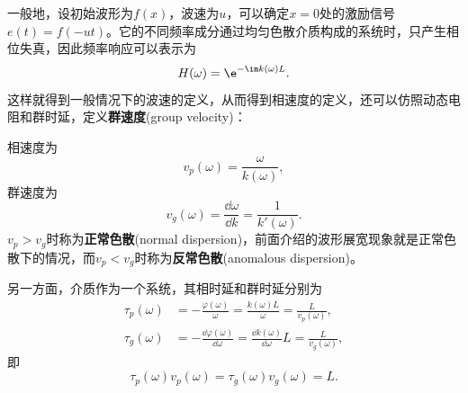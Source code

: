 一般地，设初始波形为$f(x)$，波速为$u$，可以确定$x=0$处的激励信号$e(t)=f(-ut)$。它的不同频率成分通过均匀色散介质构成的系统时，只产生相位失真，因此频率响应可以表示为
\begin{equation}
    H(\omega)=\e^{-\im k(\omega)L}.
\end{equation}
这样就得到一般情况下的波速的定义，从而得到相速度的定义，还可以仿照动态电阻和群时延，定义\textbf{群速度}(group velocity)：
\begin{definition}[相速度和群速度]
    相速度为
    \begin{equation}
        v_p(\omega)=\frac{\omega}{k(\omega)},
    \end{equation}
    群速度为
    \begin{equation}
        v_g(\omega)=\frac{\dd\omega}{\dd k}=\frac{1}{k'(\omega)}.
    \end{equation}
    $v_p>v_g$时称为\textbf{正常色散}(normal dispersion)，前面介绍的波形展宽现象就是正常色散下的情况，而$v_p<v_g$时称为\textbf{反常色散}(anomalous dispersion)。
\end{definition}
另一方面，介质作为一个系统，其相时延和群时延分别为
\begin{align}
    \tau_p(\omega)&=-\frac{\varphi(\omega)}{\omega}=\frac{k(\omega)L}{\omega}=\frac{L}{v_p(\omega)},\\
    \tau_g(\omega)&=-\frac{\dd\varphi(\omega)}{\dd\omega}=\frac{\dd k(\omega)}{\dd\omega}L=\frac{L}{v_g(\omega)},
\end{align}
即
\begin{equation}
    \tau_p(\omega)v_p(\omega)=\tau_g(\omega)v_g(\omega)=L.
\end{equation}

